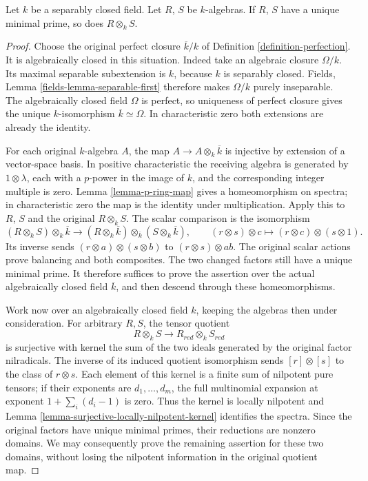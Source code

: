 \begin{lemma}
\label{lemma-separably-closed-irreducible}
Let $k$ be a separably closed field.
Let $R$, $S$ be $k$-algebras. If $R$, $S$ have a unique
minimal prime, so does $R \otimes_k S$.
\end{lemma}

\begin{proof}
Choose the original perfect closure
$\overline k/k$ of Definition
\ref{definition-perfection}. It is
algebraically closed in this situation.
Indeed take an algebraic closure
$\Omega/k$. Its maximal separable
subextension is $k$, because $k$
is separably closed. Fields, Lemma
\ref{fields-lemma-separable-first}
therefore makes $\Omega/k$ purely
inseparable. The algebraically
closed field $\Omega$ is perfect,
so uniqueness of perfect closure
gives the unique $k$-isomorphism
$\overline k\simeq\Omega$.
In characteristic zero both
extensions are already the identity.

For each original $k$-algebra $A$,
the map $A\to A\otimes_k\overline k$
is injective by extension of a
vector-space basis. In positive
characteristic the receiving algebra
is generated by $1\otimes\lambda$,
each with a $p$-power in the image
of $k$, and the corresponding
integer multiple is zero.
Lemma \ref{lemma-p-ring-map} gives
a homeomorphism on spectra; in
characteristic zero the map is
the identity under multiplication.
Apply this to $R$, $S$ and the
original $R\otimes_k S$.
The scalar comparison is the
isomorphism
$$
(R\otimes_k S)\otimes_k\overline k
\longrightarrow
(R\otimes_k\overline k)\otimes_{\overline k}
(S\otimes_k\overline k),
\qquad
(r\otimes s)\otimes c\longmapsto
(r\otimes c)\otimes(s\otimes1).
$$
Its inverse sends
$(r\otimes a)\otimes(s\otimes b)$
to $(r\otimes s)\otimes ab$.
The original scalar actions prove
balancing and both composites.
The two changed factors still
have a unique minimal prime.
It therefore suffices to prove
the assertion over the actual
algebraically closed field
$\overline k$, and then descend
through these homeomorphisms.

Work now over an algebraically
closed field $k$, keeping the
algebras then under consideration.
For arbitrary $R,S$, the tensor
quotient
$$
R\otimes_k S\longrightarrow R_{red}\otimes_k S_{red}
$$
is surjective with kernel
the sum of the two ideals
generated by the original factor
nilradicals. The inverse of its
induced quotient isomorphism
sends $[r]\otimes[s]$ to the
class of $r\otimes s$.
Each element of this kernel is
a finite sum of nilpotent pure
tensors; if their exponents are
$d_1,\ldots,d_m$, the full
multinomial expansion at exponent
$1+\sum_i(d_i-1)$ is zero.
Thus the kernel is locally
nilpotent and Lemma
\ref{lemma-surjective-locally-nilpotent-kernel}
identifies the spectra.
Since the original factors have
unique minimal primes, their
reductions are nonzero domains.
We may consequently prove the
remaining assertion for these
two domains, without losing the
nilpotent information in the
original quotient map.


\end{proof}
